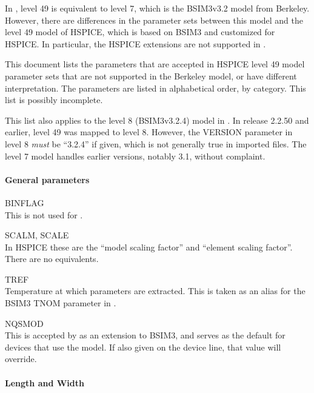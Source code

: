 In {\WRspice}, level 49 is equivalent to level 7, which is the
BSIM3v3.2 model from Berkeley.  However, there are differences in the
parameter sets between this model and the level 49 model of HSPICE,
which is based on BSIM3 and customized for HSPICE.  In particular, the
HSPICE extensions are not supported in {\WRspice}.

This document lists the parameters that are accepted in HSPICE level
49 model parameter sets that are not supported in the Berkeley model,
or have different interpretation.  The parameters are listed in
alphabetical order, by category.  This list is possibly incomplete.

This list also applies to the level 8 (BSIM3v3.2.4) model in
{\WRspice}.  In {\WRspice} release 2.2.50 and earlier, level 49 was
mapped to level 8.  However, the {\vt VERSION} parameter in level 8
{\it must} be ``3.2.4'' if given, which is not generally true in
imported files.  The level 7 model handles earlier versions, notably
3.1, without complaint.

\paragraph{General parameters}

\begin{description}
\item{\vt BINFLAG}\\
 This is not used for {\WRspice}.
\item{{\vt SCALM}, {\vt SCALE}}\\
 In HSPICE these are the ``model scaling factor'' and ``element scaling
 factor''.  There are no {\WRspice} equivalents.
\item{\vt TREF}\\
 Temperature at which parameters are extracted.  This is taken as an
 alias for the BSIM3 {\vt TNOM} parameter in {\WRspice}.
\item{\vt NQSMOD}\\
 This is accepted by {\WRspice} as an extension to BSIM3, and serves as
 the default for devices that use the model.  If also given on the
 device line, that value will override.
\end{description}

\paragraph{Length and Width}

